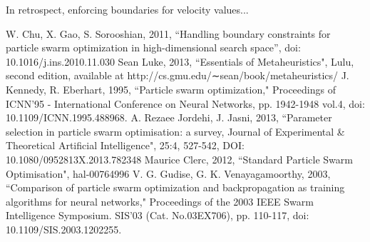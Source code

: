 \documentclass[12pt]{article}
\begin{document}
In retrospect, enforcing boundaries for velocity values...

\vspace{-1.5em}
\begin{thebibliography}{10}

 W. Chu, X. Gao, S. Sorooshian, 2011, ``Handling boundary constraints for particle swarm optimization in high-dimensional search space'', doi: 10.1016/j.ins.2010.11.030
 Sean Luke, 2013, ``Essentials of Metaheuristics", Lulu, second edition, available at http://cs.gmu.edu/∼sean/book/metaheuristics/
 J. Kennedy, R. Eberhart, 1995, ``Particle swarm optimization," Proceedings of ICNN'95 - International Conference on Neural Networks,  pp. 1942-1948 vol.4, doi: 10.1109/ICNN.1995.488968.
 A. Rezaee Jordehi, J. Jasni, 2013, ``Parameter selection in particle swarm optimisation: a survey, Journal of Experimental \& Theoretical Artificial Intelligence", 25:4, 527-542, DOI: 10.1080/0952813X.2013.782348
 Maurice Clerc, 2012, ``Standard Particle Swarm Optimisation", hal-00764996
  V. G. Gudise, G. K. Venayagamoorthy, 2003, ``Comparison of particle swarm optimization and backpropagation as training algorithms for neural networks," Proceedings of the 2003 IEEE Swarm Intelligence Symposium. SIS'03 (Cat. No.03EX706), pp. 110-117, doi: 10.1109/SIS.2003.1202255.


\end{thebibliography}
\end{document}
